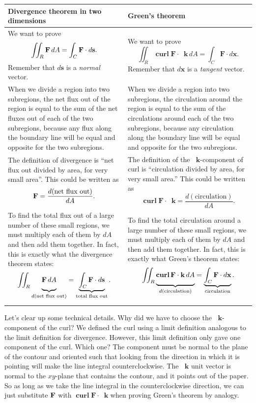 \documentclass{myarticle}
\let\div\relax
\DeclareMathOperator{\div}{div}
\DeclareMathOperator{\curl}{\mathbf{curl}}
\renewcommand{\vec}[1]{\mathbf{#1}}
\newcommand{\unitvector}[1]{
  \mathop{}\!\vec{#1}
}
\newcommand{\kh}{\unitvector{k}}
\theoremstyle{nospace}
\newtheorem{old series theorem}{Theorem}
\newenvironment{series theorem}{\begin{mdframed}\begin{old series theorem}}{\end{old series theorem}\end{mdframed}}
\begin{document}
\renewcommand{\arraystretch}{2}
\begin{longtable}{|P{0.47\textwidth}|P{0.47\textwidth}|}
\hline
Divergence theorem in two dimensions & Green's theorem \\
\hline
We want to prove \[ \iint_R \div \vec{F} \,dA = \int_C \vec{F} \cdot d\vec{s}. \] Remember that $d\vec{s}$ is a \textit{normal} vector. &
We want to prove \[ \iint_R \curl \vec{F} \cdot \kh \,dA = \int_C \vec{F} \cdot d\vec{x}. \] Remember that $d\vec{x}$ is a \textit{tangent} vector. \\

When we divide a region into two subregions, the net flux out of the region is equal to the sum of the net fluxes out of each of the two subregions, because any flux along the boundary line will be equal and opposite for the two subregions. &
When we divide a region into two subregions, the circulation around the region is equal to the sum of the circulations around each of the two subregions, because any circulation along the boundary line will be equal and opposite for the two subregions. \\

The definition of divergence is ``net flux out divided by area, for very small area''. This could be written as \[ \div \vec{F} = \frac{d(\text{net flux out})}{dA}. \] &
The definition of the $\kh$-component of curl is ``circulation divided by area, for very small area.'' This could be written as \[ \curl \vec{F} \cdot \kh = \frac{d(\text{circulation})}{dA}. \] \\

To find the total flux out of a large number of these small regions, we must multiply each of them by $dA$ and then add them together. In fact, this is exactly what the divergence theorem states: \[ \iint_R \underbrace{\div \vec{F} \,dA\vphantom{\int}}_{d(\text{net flux out})} = \underbrace{\int_C \vec{F} \cdot d\vec{s}}_\text{total flux out}. \] &
To find the total circulation around a large number of these small regions, we must multiply each of them by $dA$ and then add them together. In fact, this is exactly what Green's theorem states: \[ \iint_R \underbrace{\curl \vec{F} \cdot \kh \,dA\vphantom{\int}}_{d(\text{circulation})} = \underbrace{\int_C \vec{F} \cdot d\vec{x}}_\text{circulation}. \] \\
\hline
\end{longtable}

Let's clear up some technical details. Why did we have to choose the $\kh$-component of the curl? We defined the curl using a limit definition analogous to the limit definition for divergence. However, this limit definition only gave one component of the curl. Which one? The component must be normal to the plane of the contour and oriented such that looking from the direction in which it is pointing will make the line integral counterclockwise. The $\kh$ unit vector is normal to the $xy$-plane that contains the contour, and it points out of the paper. So as long as we take the line integral in the counterclockwise direction, we can just substitute $\div \vec{F}$ with $\curl \vec{F} \cdot \kh$ when proving Green's theorem by analogy.
\end{document}
